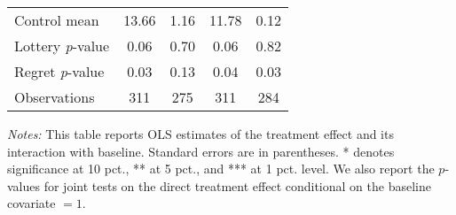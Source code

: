 \begin{table}[htbp]
{\begin{threeparttable}
\begin{tabular}{l*{4}{c}}
Control mean    &    13.66         &     1.16         &    11.78         &     0.12         \\
Lottery \emph{p}-value&     0.06         &     0.70         &     0.06         &     0.82         \\
Regret \emph{p}-value&     0.03         &     0.13         &     0.04         &     0.03         \\
Observations    &      311         &      275         &      311         &      284         \\
\bottomrule \end{tabular} \begin{tablenotes}[flushleft] \footnotesize \item \emph{Notes:} This table reports OLS estimates of the treatment effect and its interaction with baseline. Standard errors are in parentheses. * denotes significance at 10 pct., ** at 5 pct., and *** at 1 pct. level. We also report the \(p\)-values for joint tests on the direct treatment effect conditional on the baseline covariate $= 1$. \end{tablenotes} \end{threeparttable} } \end{table}
